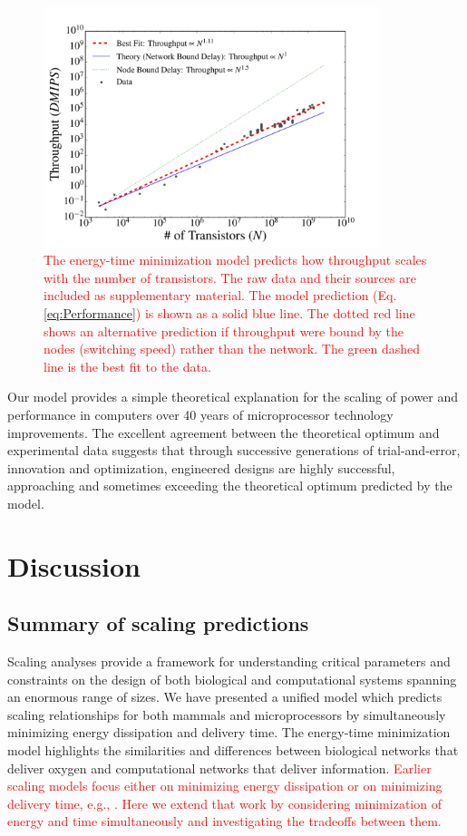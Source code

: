 \documentclass[12pt]{article}
\newcommand{\red}[1]{\textcolor{red}{#1}}
\begin{document}
\begin{figure}[!h]
\centering
\includegraphics[height=70mm]{Figures/ChipsThroughputScaling.pdf}
\caption{\red{The energy-time minimization model predicts how throughput
  scales with the number of transistors.  The raw data and their sources are included as
  supplementary material. The model
 prediction  (Eq. \ref{eq:Performance}) is shown as a solid blue
  line. The dotted red line shows an alternative prediction if throughput were 
  bound by the nodes (switching speed) rather than the network. The
  green dashed line is the best fit to the data.}}
\label{fig:throughput}
\end{figure}

Our model provides a simple theoretical explanation for the scaling of power
and performance in computers over 40 years of microprocessor technology
improvements.  The excellent agreement between the theoretical optimum and
experimental data suggests that through successive generations of
trial-and-error, innovation and optimization, engineered designs are highly
successful, approaching and sometimes exceeding the theoretical optimum predicted by the model.


\section{Discussion}
\label{sec:discussion}

\subsection{Summary of scaling predictions}
Scaling analyses provide a framework for understanding critical
parameters and constraints on the design of both biological and
computational systems spanning an enormous range of sizes.   We have
presented a unified model which predicts scaling relationships for both mammals and
microprocessors by simultaneously minimizing energy dissipation and delivery time. 
The energy-time minimization model highlights the similarities and
differences between biological networks that deliver oxygen and
computational networks that deliver information.  \red{Earlier scaling
models focus either on minimizing energy dissipation or on minimizing
delivery time, e.g., \cite{west97,banavar10}.  Here we extend that work by considering minimization of energy and time
simultaneously and investigating the tradeoffs between them.}
\end{document}
